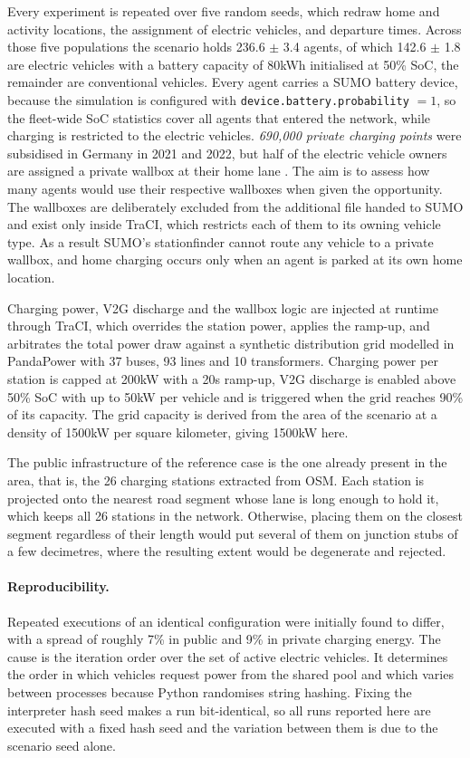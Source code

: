 Every experiment is repeated over five random seeds, which redraw home and activity locations, the assignment of electric vehicles, and departure times. Across those five populations the scenario holds 236.6 $\pm$ 3.4 agents, of which 142.6 $\pm$ 1.8 are electric vehicles with a battery capacity of 80kWh initialised at 50\% \ac{SoC}, the remainder are conventional vehicles. Every agent carries a \ac{SUMO} battery device, because the simulation is configured with \texttt{device.battery.probability} $=1$, so the fleet-wide \ac{SoC} statistics cover all agents that entered the network, while charging is restricted to the electric vehicles. \emph{690,000 private charging points} were subsidised in Germany in 2021 and 2022, but half of the electric vehicle owners are assigned a private wallbox at their home lane \cite{NationaleLeitstelle2024}. The aim is to assess how many agents would use their respective wallboxes when given the opportunity. The wallboxes are deliberately excluded from the additional file handed to \ac{SUMO} and exist only inside \ac{TraCI}, which restricts each of them to its owning vehicle type. As a result \ac{SUMO}'s stationfinder cannot route any vehicle to a private wallbox, and home charging occurs only when an agent is parked at its own home location.

Charging power, \ac{V2G} discharge and the wallbox logic are injected at runtime through \ac{TraCI}, which overrides the station power, applies the ramp-up, and arbitrates the total power draw against a synthetic distribution grid modelled in PandaPower with 37 buses, 93 lines and 10 transformers. Charging power per station is capped at 200kW with a 20s ramp-up, \ac{V2G} discharge is enabled above 50\% \ac{SoC} with up to 50kW per vehicle and is triggered when the grid reaches 90\% of its capacity. The grid capacity is derived from the area of the scenario at a density of 1500kW per square kilometer, giving 1500kW here.

The public infrastructure of the reference case is the one already present in the area, that is, the 26 charging stations extracted from \ac{OSM}. Each station is projected onto the nearest road segment whose lane is long enough to hold it, which keeps all 26 stations in the network. Otherwise, placing them on the closest segment regardless of their length would put several of them on junction stubs of a few decimetres, where the resulting extent would be degenerate and rejected.

\paragraph{Reproducibility.} Repeated executions of an identical configuration were initially found to differ, with a spread of roughly 7\% in public and 9\% in private charging energy. The cause is the iteration order over the set of active electric vehicles. It determines the order in which vehicles request power from the shared pool and which varies between processes because Python randomises string hashing. Fixing the interpreter hash seed makes a run bit-identical, so all runs reported here are executed with a fixed hash seed and the variation between them is due to the scenario seed alone.

